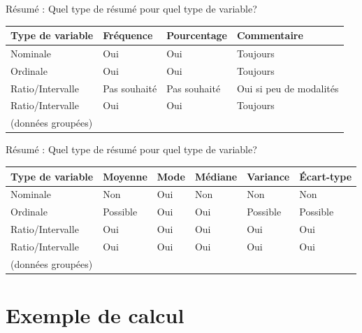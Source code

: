 \documentclass[
  ignorenonframetext,
]{beamer}
\begin{document}
\begin{frame}{Résumé : Quel type de résumé pour quel type de variable?}
\protect\hypertarget{ruxe9sumuxe9-quel-type-de-ruxe9sumuxe9-pour-quel-type-de-variable}{}
\begin{longtable}[]{@{}llll@{}}
\toprule()
Type de variable & Fréquence & Pourcentage & Commentaire \\
\midrule()
\endhead
Nominale & Oui & Oui & Toujours \\
Ordinale & Oui & Oui & Toujours \\
Ratio/Intervalle & Pas souhaité & Pas souhaité & Oui si peu de
modalités \\
Ratio/Intervalle & Oui & Oui & Toujours \\
(données groupées) & & & \\
\bottomrule()
\end{longtable}
\end{frame}

\begin{frame}{Résumé : Quel type de résumé pour quel type de variable?}
\protect\hypertarget{ruxe9sumuxe9-quel-type-de-ruxe9sumuxe9-pour-quel-type-de-variable-1}{}
\begin{longtable}[]{@{}llllll@{}}
\toprule()
Type de variable & Moyenne & Mode & Médiane & Variance & Écart-type \\
\midrule()
\endhead
Nominale & Non & Oui & Non & Non & Non \\
Ordinale & Possible & Oui & Oui & Possible & Possible \\
Ratio/Intervalle & Oui & Oui & Oui & Oui & Oui \\
Ratio/Intervalle & Oui & Oui & Oui & Oui & Oui \\
(données groupées) & & & & & \\
\bottomrule()
\end{longtable}
\end{frame}

\hypertarget{exemple-de-calcul}{%
\section{Exemple de calcul}\label{exemple-de-calcul}}
\end{document}
